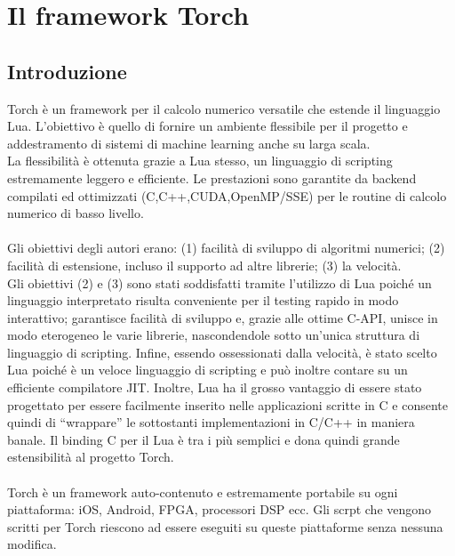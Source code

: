 
\chapter{Il framework Torch} %
\label{AppendixB} %
\def \path {Appendices/}
\section{Introduzione}
Torch\parencite{WTorch} è un framework per il calcolo numerico versatile che estende il linguaggio Lua. L'obiettivo è quello di fornire un ambiente flessibile per il progetto e addestramento di sistemi di machine learning anche su larga scala.\\
La flessibilità è ottenuta grazie a Lua stesso, un linguaggio di scripting estremamente leggero e efficiente. Le prestazioni sono garantite da backend compilati ed ottimizzati (C,C++,CUDA,OpenMP/SSE) per le routine di calcolo numerico di basso livello.
\\
\\
Gli obiettivi degli autori erano: (1) facilità di sviluppo di algoritmi numerici; (2) facilità di
estensione, incluso il supporto ad altre librerie; (3) la velocità.\\
Gli obiettivi (2) e (3) sono stati soddisfatti tramite l'utilizzo di Lua poiché un linguaggio interpretato risulta conveniente per il testing rapido in modo interattivo; garantisce facilità di sviluppo e, grazie alle ottime C-API, unisce in modo eterogeneo le varie librerie,
nascondendole sotto un'unica struttura di linguaggio di scripting.  Infine, essendo ossessionati dalla velocità, è stato scelto Lua poiché è un veloce linguaggio di scripting e può inoltre contare su un efficiente compilatore JIT.
Inoltre, Lua ha il grosso vantaggio di essere stato progettato per essere facilmente inserito nelle applicazioni scritte in C e consente quindi di “wrappare” le sottostanti implementazioni in C/C++ in maniera banale. Il binding C per il Lua è tra i più semplici e dona quindi grande estensibilità al progetto Torch. 
\\
\\
Torch è un framework auto-contenuto e estremamente portabile su ogni piattaforma: iOS, Android, FPGA, processori DSP ecc. Gli scrpt che vengono scritti per Torch riescono ad essere eseguiti su queste piattaforme senza nessuna modifica.
\\
